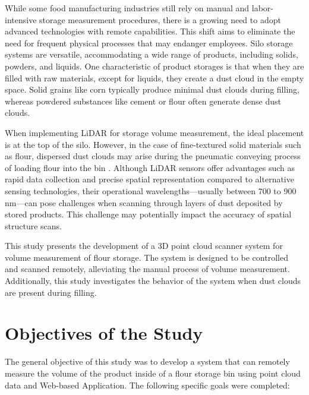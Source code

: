 While some food manufacturing industries still rely on manual and labor-intensive storage measurement procedures, there is a growing need to adopt advanced technologies with remote capabilities. This shift aims to eliminate the need for frequent physical processes that may endanger employees. Silo storage systems are versatile, accommodating a wide range of products, including solids, powders, and liquids. One characteristic of product storages is that when they are filled with raw materials, except for liquids, they create a dust cloud in the empty space. Solid grains like corn typically produce minimal dust clouds during filling, whereas powdered substances like cement or flour often generate dense dust clouds.

When implementing LiDAR for storage volume measurement, the ideal placement is at the top of the silo. However, in the case of fine-textured solid materials such as flour, dispersed dust clouds may arise during the pneumatic conveying process of loading flour into the bin \citep{williams2007}. Although LiDAR sensors offer advantages such as rapid data collection and precise spatial representation compared to alternative sensing technologies, their operational wavelengths—usually between 700 to 900 nm—can pose challenges when scanning through layers of dust deposited by stored products. This challenge may potentially impact the accuracy of spatial structure scans.

This study presents the development of a 3D point cloud scanner system for volume measurement of flour storage. The system is designed to be controlled and scanned remotely, alleviating the manual process of volume measurement. Additionally, this study investigates the behavior of the system when dust clouds are present during filling.


\section{Objectives of the Study}
\label{intro:sec:Objectives of the Study}
The general objective of this study was to develop a system that can remotely measure the volume of the product inside of a flour storage bin using point cloud data and Web-based Application. The following specific goals were completed:

